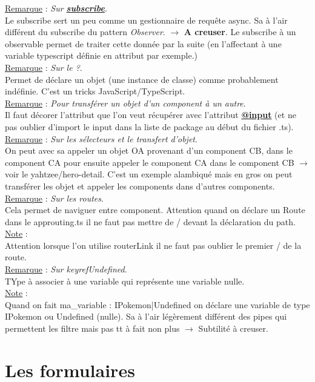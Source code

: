 \documentclass[a4paper,12pt,twoside]{article}
\newcommand{\urlcolor}{magenta}  %
\newcommand{\keycolor}{purple} %
\newcommand{\incode}[1]{{\footnotesize\ttfamily #1}} %
\newcommand{\rem}[2]{\noindent\underline{Remarque} : \textit{#1}.\\ \indent #2}
\newcommand{\note}[1]{\noindent\underline{Note} : \\ \indent #1}
\newcommand{\keyref}[2]{\hypersetup{urlcolor=\keycolor} \href{#1}{\textbf{#2}}\hypersetup{urlcolor=\urlcolor}}
\begin{document}
\rem{Sur \keyref{https://angular.io/guide/observables\#subscribing}{subscribe}}{Le \incode{subscribe} sert un peu comme un gestionnaire de requête async. Sa à l'air différent du subscribe du pattern \textit{Observer}. $\to$ \textbf{A creuser}. Le subscribe à un observable permet de traiter cette donnée par la suite (en l'affectant à une variable typescript définie en attribut par exemple.)}\\

\rem{Sur le \incode{?}}{Permet de déclare un objet (une instance de classe) comme probablement indéfinie. C'est un tricks JavaScript/TypeScript.}\\

\rem{Pour transférer un objet d'un component à un autre}{Il faut décorer l'attribut que l'on veut récupérer avec l'attribut \keyref{https://angular.io/guide/inputs-outputs}{@input} (et ne pas oublier d'\incode{import} le input dans la liste de package au début du fichier .ts).}\\

\rem{Sur les sélecteurs et le transfert d'objet}{On peut avec sa appeler un objet OA provenant d'un component CB, dans le component CA pour ensuite appeler le component CA dans le component CB $\to$ voir le yahtzee/hero-detail. C'est un exemple alambiqué mais en gros on peut transférer les objet et appeler les components dans d'autres components.}\\

\rem{Sur les routes}{Cela permet de naviguer entre component. Attention quand on déclare un \incode{Route} dans le approuting.ts il ne faut pas mettre de / devant la déclaration du \incode{path}.}\\

\note{Attention lorsque l'on utilise \incode{routerLink} il ne faut pas oublier le premier / de la route.}\\

\rem{Sur keyref{}{Undefined}}{ TYpe à associer à une variable qui représente une variable nulle.}\\

\note{Quand on fait ma\_variable : IPokemon|Undefined on déclare une variable de type IPokemon ou Undefined (nulle). Sa à l'air légèrement différent des pipes qui permettent les filtre mais pas tt à fait non plus $\to$ Subtilité à creuser.}\\

\section{Les formulaires}
\end{document}

